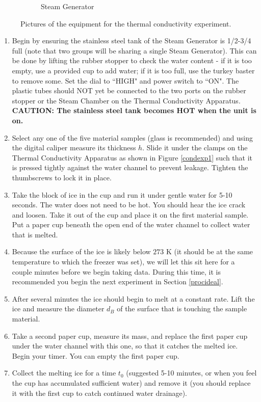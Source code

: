 \begin{figure}
\begin{subfigure}{0.48\textwidth}
		\caption{Steam Generator}
		\label{condexp2}
\end{subfigure}
\caption{Pictures of the equipment for the thermal conductivity experiment.}
\label{condexp}
\end{figure}

\begin{enumerate}
	\item Begin by ensuring the stainless steel tank of the Steam Generator is 1/2-3/4 full (note that two groups will be sharing a single Steam Generator).  This can be done by lifting the rubber stopper to check the water content - if it is too empty, use a provided cup to add water; if it is too full, use the turkey baster to remove some.  Set the dial to ``HIGH" and power switch to ``ON".  The plastic tubes should NOT yet be connected to the two ports on the rubber stopper or the Steam Chamber on the Thermal Conductivity Apparatus.  \textbf{CAUTION: The stainless steel tank becomes HOT when the unit is on.}
	\item Select any one of the five material samples (glass is recommended) and using the digital caliper measure its thickness $h$.  Slide it under the clamps on the Thermal Conductivity Apparatus as shown in Figure \ref{condexp1} such that it is pressed tightly against the water channel to prevent leakage.  Tighten the thumbscrews to lock it in place.
	\item Take the block of ice in the cup and run it under gentle water for 5-10 seconds.  The water does not need to be hot.  You should hear the ice crack and loosen.  Take it out of the cup and place it on the first material sample.  Put a paper cup beneath the open end of the water channel to collect water that is melted.
	\item Because the surface of the ice is likely below $273$ K (it should be at the same temperature to which the freezer was set), we will let this sit here for a couple minutes before we begin taking data.  During this time, it is recommended you begin the next experiment in Section \ref{procideal}.
	\item After several minutes the ice should begin to melt at a constant rate.  Lift the ice and measure the diameter $d_B$ of the surface that is touching the sample material.
	\item Take a second paper cup, measure its mass, and replace the first paper cup under the water channel with this one, so that it catches the melted ice.  Begin your timer.  You can empty the first paper cup.
	\item Collect the melting ice for a time $t_{0}$ (suggested 5-10 minutes, or when you feel the cup has accumulated sufficient water) and remove it (you should replace it with the first cup to catch continued water drainage).

\end{enumerate}
